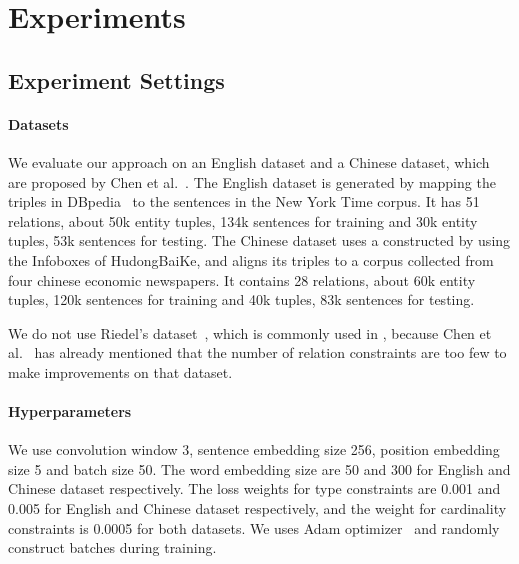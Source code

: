 \section{Experiments}

\subsection{Experiment Settings}
\paragraph{Datasets}
We evaluate our approach on an English dataset and a Chinese dataset, which are proposed by Chen et al.~.
The English dataset is generated by mapping the triples in DBpedia~\cite{bizer2009dbpedia} to the sentences in the New York Time corpus. It has 51 relations, about 50k entity tuples, 134k sentences for training and 30k entity tuples, 53k sentences for testing.
The Chinese dataset uses a \KB constructed by using the Infoboxes of HudongBaiKe,
and aligns its triples to a corpus collected from four chinese economic newspapers.
It contains 28 relations, about 60k entity tuples, 120k sentences for training and 40k tuples, 83k sentences for testing.

We do not use Riedel's dataset~\cite{riedel2010modeling}, which is commonly used in \RE, because  Chen et al.~ has already mentioned that the number of relation constraints are too few to make improvements on that dataset.


\paragraph{Hyperparameters}
We use convolution window 3, sentence embedding size 256, position embedding size 5 and batch size 50.
The word embedding size are 50 and 300 for English and Chinese dataset respectively.
The loss weights for type constraints are 0.001 and 0.005 for English and Chinese dataset respectively, 
and the weight for cardinality constraints is 0.0005 for both datasets.
We uses Adam optimizer~\cite{kingma2014adam} and randomly construct batches during training.


